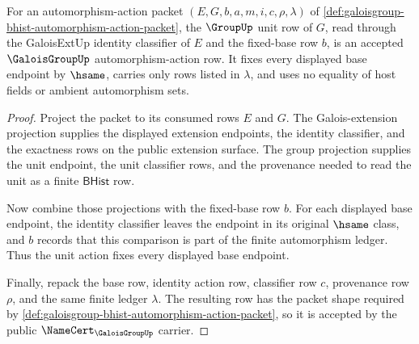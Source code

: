 \begin{theorem}
\label{thm:galoisgroup-identity-row-closure}
For an automorphism-action packet $(E,G,b,a,m,i,c,\rho,\lambda)$ of
\autoref{def:galoisgroup-bhist-automorphism-action-packet}, the $\GroupUp$
unit row of $G$, read through the GaloisExtUp identity classifier of $E$ and
the fixed-base row $b$, is an accepted $\GaloisGroupUp$ automorphism-action row.
It fixes every displayed base endpoint by $\hsame$, carries only rows listed in
$\lambda$, and uses no equality of host fields or ambient automorphism sets.
\end{theorem}
\begin{proof}
Project the packet to its consumed rows $E$ and $G$. The Galois-extension
projection supplies the displayed extension endpoints, the identity classifier,
and the exactness rows on the public extension surface. The group projection
supplies the unit endpoint, the unit classifier rows, and the provenance needed
to read the unit as a finite $\mathsf{BHist}$ row.

Now combine those projections with the fixed-base row $b$. For each displayed
base endpoint, the identity classifier leaves the endpoint in its original
$\hsame$ class, and $b$ records that this comparison is part of the finite
automorphism ledger. Thus the unit action fixes every displayed base endpoint.

Finally, repack the base row, identity action row, classifier row $c$,
provenance row $\rho$, and the same finite ledger $\lambda$. The resulting row
has the packet shape required by
\autoref{def:galoisgroup-bhist-automorphism-action-packet}, so it is accepted
by the public $\NameCert_{\GaloisGroupUp}$ carrier.
\end{proof}

